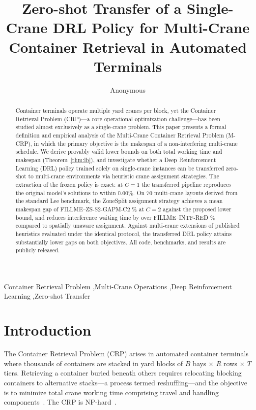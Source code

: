 \documentclass[11pt,a4paper]{elsarticle}
\begin{document}
\begin{frontmatter}
\title{Zero-shot Transfer of a Single-Crane DRL Policy for Multi-Crane Container Retrieval in Automated Terminals}
\author[inst]{Anonymous}
\address[inst]{University, Country}

\begin{abstract}
Container terminals operate multiple yard cranes per block, yet the Container Retrieval Problem (CRP)---a core operational optimization challenge---has been studied almost exclusively as a single-crane problem. This paper presents a formal definition and empirical analysis of the Multi-Crane Container Retrieval Problem (M-CRP), in which the primary objective is the makespan of a non-interfering multi-crane schedule. We derive provably valid lower bounds on both total working time and makespan (Theorem~\ref{thm:lb}), and investigate whether a Deep Reinforcement Learning (DRL) policy trained solely on single-crane instances can be transferred zero-shot to multi-crane environments via heuristic crane assignment strategies. The extraction of the frozen policy is exact: at $C=1$ the transferred pipeline reproduces the original model's solutions to within $0.00\%$. On 70 multi-crane layouts derived from the standard Lee benchmark, the ZoneSplit assignment strategy achieves a mean makespan gap of FILLME--ZS-S2-GAPM-C2
\% at $C=2$ against the proposed lower bound, and reduces interference waiting time by over FILLME--INTF-RED
\% compared to spatially unaware assignment. Against multi-crane extensions of published heuristics evaluated under the identical protocol, the transferred DRL policy attains substantially lower gaps on both objectives. All code, benchmarks, and results are publicly released.
\end{abstract}

\begin{keyword}
Container Retrieval Problem \sep Multi-Crane Operations \sep Deep Reinforcement Learning \sep Zero-shot Transfer
\end{keyword}
\end{frontmatter}

\section{Introduction}
\label{sec:intro}

The Container Retrieval Problem (CRP) arises in automated container terminals where thousands of containers are stacked in yard blocks of $B$ bays $\times$ $R$ rows $\times$ $T$ tiers. Retrieving a container buried beneath others requires relocating blocking containers to alternative stacks---a process termed reshuffling---and the objective is to minimize total crane working time comprising travel and handling components~\cite{shin2026}. The CRP is NP-hard~\cite{caserta2012,shin2026}.
\end{document}
